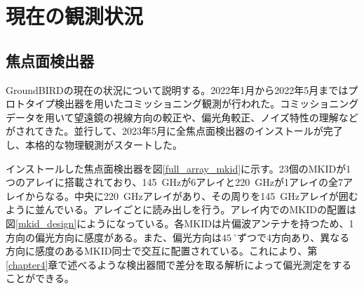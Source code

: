\section{現在の観測状況}

\subsection{焦点面検出器}
\label{full_array}
GroundBIRDの現在の状況について説明する。2022年1月から2022年5月まではプロトタイプ検出器を用いたコミッショニング観測が行われた。コミッショニングデータを用いて望遠鏡の視線方向の較正\cite{sueno_paper}や、偏光角較正、ノイズ特性の理解\cite{sueno_doctor}などがされてきた。並行して、2023年5月に全焦点面検出器のインストールが完了し、本格的な物理観測がスタートした。

インストールした焦点面検出器を図\ref{full_array_mkid}に示す。23個のMKIDが1つのアレイに搭載されており、\SI{145}{GHz}が6アレイと\SI{220}{GHz}が1アレイの全7アレイからなる。中央に\SI{220}{GHz}アレイがあり、その周りを\SI{145}{GHz}アレイが囲むように並んでいる。アレイごとに読み出しを行う。アレイ内でのMKIDの配置は図\ref{mkid_design}にようになっている。各MKIDは片偏波アンテナを持つため、1方向の偏光方向に感度がある。また、偏光方向は$\SI{45}{^{\circ}}$ずつで4方向あり、異なる方向に感度のあるMKID同士で交互に配置されている。これにより、第\ref{chapter4}章で述べるような検出器間で差分を取る解析によって偏光測定をすることができる。

